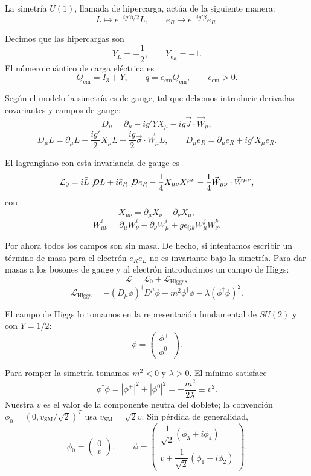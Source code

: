 \documentclass[11pt,a4paper]{article}
\newcommand{\concept}[1]{\textcolor{concept-green}{#1}}
\begin{document}
La simetría $U(1)$, llamada de \concept{hipercarga}, actúa de la siguiente
manera:
\[
  L\longmapsto e^{-ig'\beta/2}L,
  \qquad
  e_R\longmapsto e^{-ig'\beta}e_R.
\]

Decimos que las hipercargas son
\[
  Y_L=-\frac12,
  \qquad
  Y_{e_R}=-1.
\]
El número cuántico de carga eléctrica es
\[
  Q_{\mathrm{em}}=I_3+Y,\qquad q=e_{\mathrm{em}}Q_{\mathrm{em}},
  \qquad e_{\mathrm{em}}>0.
\]

Según el modelo la simetría es de gauge, tal que debemos introducir derivadas
covariantes y campos de gauge:
\[
  D_\mu=\partial_\mu-ig'YX_\mu-ig\vec J\cdot\vec W_\mu,
\]
\[
  D_\mu L
  =\partial_\mu L+\frac{ig'}2X_\mu L
   -\frac{ig}2\vec\sigma\cdot\vec W_\mu L,
  \qquad
  D_\mu e_R=\partial_\mu e_R+ig'X_\mu e_R.
\]

El lagrangiano con esta invariancia de gauge es
\[
  \mathcal L_0
  =i\bar L\not\!D L+i\bar e_R\not\!D e_R
   -\frac14X_{\mu\nu}X^{\mu\nu}
   -\frac14\vec W_{\mu\nu}\cdot\vec W^{\mu\nu},
\]
con
\[
  X_{\mu\nu}=\partial_\mu X_\nu-\partial_\nu X_\mu,
\]
\[
  W_{\mu\nu}^i
  =\partial_\mu W_\nu^i-\partial_\nu W_\mu^i
   +g\epsilon_{ijk}W_\mu^jW_\nu^k.
\]

Por ahora todos los campos son sin masa. De hecho, si intentamos escribir un
término de masa para el electrón $\bar e_Re_L$ no es invariante bajo la
simetría. Para dar masas a los bosones de gauge y al electrón introducimos un
campo de Higgs:
\[
  \mathcal L=\mathcal L_0+\mathcal L_{\mathrm{Higgs}},
\]
\[
  \mathcal L_{\mathrm{Higgs}}
  =-(D_\mu\phi)^\dagger D^\mu\phi
   -m^2\phi^\dagger\phi
   -\lambda(\phi^\dagger\phi)^2.
\]

El campo de Higgs lo tomamos en la representación fundamental de $SU(2)$ y con
$Y=1/2$:
\[
  \phi=\begin{pmatrix}\phi^+\\\phi^0\end{pmatrix}.
\]

Para romper la simetría tomamos $m^2<0$ y $\lambda>0$. El mínimo satisface
\[
  \phi^\dagger\phi=|\phi^+|^2+|\phi^0|^2
  =-\frac{m^2}{2\lambda}\equiv v^2.
\]
Nuestra $v$ es el valor de la componente neutra del doblete;
la convención $\phi_0=(0,v_{\mathrm{SM}}/\sqrt2)^T$ usa
$v_{\mathrm{SM}}=\sqrt2v$.
Sin pérdida de generalidad,
\[
  \phi_0=\begin{pmatrix}0\\v\end{pmatrix},
  \qquad
  \phi=
  \begin{pmatrix}
    \dfrac1{\sqrt2}(\phi_3+i\phi_4)\\[2mm]
    v+\dfrac1{\sqrt2}(\phi_1+i\phi_2)
  \end{pmatrix}.
\]
\end{document}
